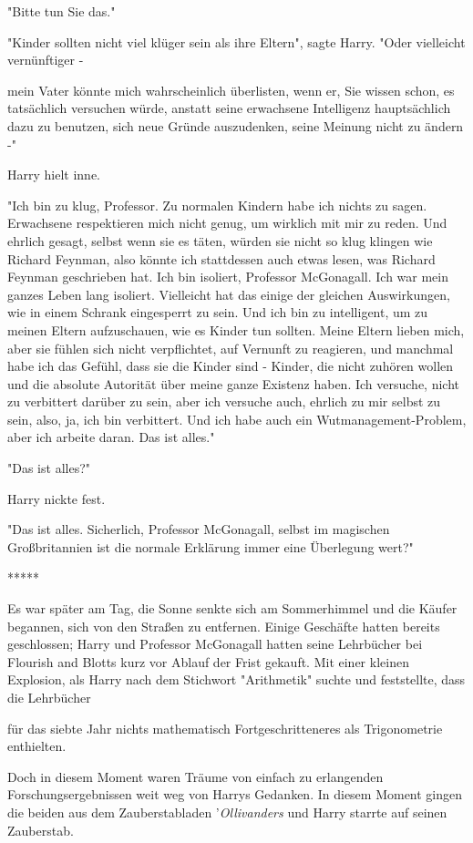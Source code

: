 {"Bitte tun Sie das."

"Kinder sollten nicht viel klüger sein als ihre Eltern", sagte Harry. "Oder vielleicht vernünftiger -

mein Vater könnte mich wahrscheinlich überlisten, wenn er, Sie wissen schon, es tatsächlich versuchen würde, anstatt seine erwachsene Intelligenz hauptsächlich dazu zu benutzen, sich neue Gründe auszudenken, seine Meinung nicht zu ändern -"

Harry hielt inne.

"Ich bin zu klug, Professor. Zu normalen Kindern habe ich nichts zu sagen. Erwachsene respektieren mich nicht genug, um wirklich mit mir zu reden. Und ehrlich gesagt, selbst wenn sie es täten, würden sie nicht so klug klingen wie Richard Feynman, also könnte ich stattdessen auch etwas lesen, was Richard Feynman geschrieben hat. Ich bin isoliert, Professor McGonagall. Ich war mein ganzes Leben lang isoliert. Vielleicht hat das einige der gleichen Auswirkungen, wie in einem Schrank eingesperrt zu sein. Und ich bin zu intelligent, um zu meinen Eltern aufzuschauen, wie es Kinder tun sollten. Meine Eltern lieben mich, aber sie fühlen sich nicht verpflichtet, auf Vernunft zu reagieren, und manchmal habe ich das Gefühl, dass sie die Kinder sind - Kinder, die nicht zuhören wollen und die absolute Autorität über meine ganze Existenz haben. Ich versuche, nicht zu verbittert darüber zu sein, aber ich versuche auch, ehrlich zu mir selbst zu sein, also, ja, ich bin verbittert. Und ich habe auch ein Wutmanagement-Problem, aber ich arbeite daran. Das ist alles."

"Das ist alles?"

Harry nickte fest.

"Das ist alles. Sicherlich, Professor McGonagall, selbst im magischen Großbritannien ist die normale Erklärung immer eine Überlegung wert?"

*****

Es war später am Tag, die Sonne senkte sich am Sommerhimmel und die Käufer begannen, sich von den Straßen zu entfernen. Einige Geschäfte hatten bereits geschlossen; Harry und Professor McGonagall hatten seine Lehrbücher bei Flourish and Blotts kurz vor Ablauf der Frist gekauft. Mit einer kleinen Explosion, als Harry nach dem Stichwort "Arithmetik" suchte und feststellte, dass die Lehrbücher

für das siebte Jahr nichts mathematisch Fortgeschritteneres als Trigonometrie enthielten.

Doch in diesem Moment waren Träume von einfach zu erlangenden Forschungsergebnissen weit weg von Harrys Gedanken. In diesem Moment gingen die beiden aus dem Zauberstabladen '\emph{Ollivanders} und Harry starrte auf seinen Zauberstab.

}
